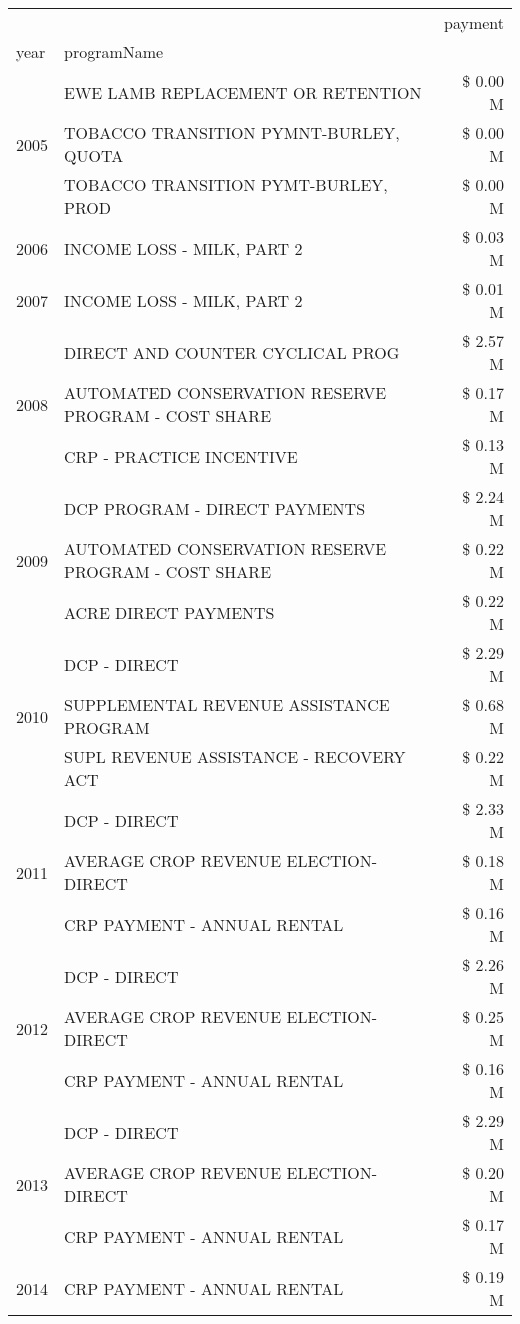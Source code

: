 \begin{tabular}{llr}
\toprule
 &  & payment \\
year & programName &  \\
\midrule
\multirow[t]{3}{*}{2005} & EWE LAMB REPLACEMENT OR RETENTION & \$ 0.00 M \\
 & TOBACCO TRANSITION PYMNT-BURLEY, QUOTA & \$ 0.00 M \\
 & TOBACCO TRANSITION PYMT-BURLEY, PROD & \$ 0.00 M \\
\cline{1-3}
2006 & INCOME LOSS - MILK, PART 2 & \$ 0.03 M \\
\cline{1-3}
2007 & INCOME LOSS - MILK, PART 2 & \$ 0.01 M \\
\cline{1-3}
\multirow[t]{3}{*}{2008} & DIRECT AND COUNTER CYCLICAL PROG & \$ 2.57 M \\
 & AUTOMATED CONSERVATION RESERVE PROGRAM - COST SHARE & \$ 0.17 M \\
 & CRP - PRACTICE INCENTIVE & \$ 0.13 M \\
\cline{1-3}
\multirow[t]{3}{*}{2009} & DCP PROGRAM - DIRECT PAYMENTS & \$ 2.24 M \\
 & AUTOMATED CONSERVATION RESERVE PROGRAM - COST SHARE & \$ 0.22 M \\
 & ACRE DIRECT PAYMENTS & \$ 0.22 M \\
\cline{1-3}
\multirow[t]{3}{*}{2010} & DCP - DIRECT & \$ 2.29 M \\
 & SUPPLEMENTAL REVENUE ASSISTANCE PROGRAM & \$ 0.68 M \\
 & SUPL REVENUE ASSISTANCE - RECOVERY ACT & \$ 0.22 M \\
\cline{1-3}
\multirow[t]{3}{*}{2011} & DCP - DIRECT & \$ 2.33 M \\
 & AVERAGE CROP REVENUE ELECTION-DIRECT & \$ 0.18 M \\
 & CRP PAYMENT - ANNUAL RENTAL & \$ 0.16 M \\
\cline{1-3}
\multirow[t]{3}{*}{2012} & DCP - DIRECT & \$ 2.26 M \\
 & AVERAGE CROP REVENUE ELECTION-DIRECT & \$ 0.25 M \\
 & CRP PAYMENT - ANNUAL RENTAL & \$ 0.16 M \\
\cline{1-3}
\multirow[t]{3}{*}{2013} & DCP - DIRECT & \$ 2.29 M \\
 & AVERAGE CROP REVENUE ELECTION-DIRECT & \$ 0.20 M \\
 & CRP PAYMENT - ANNUAL RENTAL & \$ 0.17 M \\
\cline{1-3}
\multirow[t]{3}{*}{2014} & CRP PAYMENT - ANNUAL RENTAL & \$ 0.19 M \\

\end{tabular}
